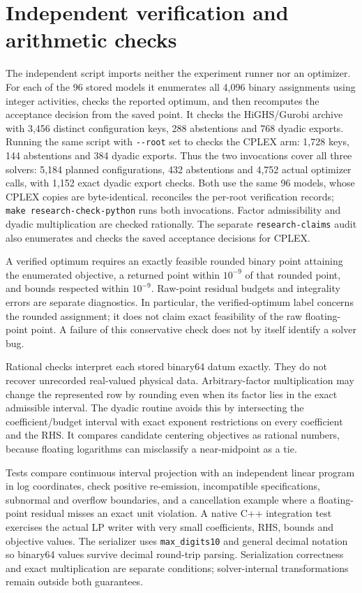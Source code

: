 \documentclass[11pt]{article}
\begin{document}
\section{Independent verification and arithmetic checks}
The independent script  imports
neither the experiment runner nor an optimizer. For each of the 96 stored models it
enumerates all 4,096 binary assignments using integer activities, checks the reported
optimum, and then recomputes the acceptance decision from the saved point. It checks
the HiGHS/Gurobi archive with 3,456 distinct configuration keys, 288 abstentions and
768 dyadic exports. Running the same script with \texttt{-{}-root} set to
 checks the CPLEX arm:
1,728 keys, 144 abstentions and 384 dyadic exports. Thus the two invocations cover
all three solvers: 5,184 planned configurations, 432 abstentions and 4,752 actual
optimizer calls, with 1,152 exact dyadic export checks. Both use the same 96 models,
whose CPLEX copies are byte-identical. 
reconciles the per-root verification records; \texttt{make research-check-python}
runs both invocations. Factor admissibility and dyadic multiplication are checked
rationally. The separate \texttt{research-claims} audit also enumerates and checks
the saved acceptance decisions for CPLEX.

A verified optimum requires an exactly feasible rounded binary point attaining the
enumerated objective, a returned point within $10^{-9}$ of that rounded point,
and bounds respected within $10^{-9}$. Raw-point residual budgets and integrality
errors are separate diagnostics. In particular, the verified-optimum label concerns
the rounded assignment; it does not claim exact feasibility of the raw floating-point
point. A failure of this conservative check does not by itself identify a solver bug.

Rational checks interpret each stored binary64 datum exactly. They do not recover
unrecorded real-valued physical data. Arbitrary-factor multiplication may change the
represented row by rounding even when its factor lies in the exact admissible
interval. The dyadic routine avoids this by intersecting the coefficient/budget
interval with exact exponent restrictions on every coefficient and the RHS.
It compares candidate centering objectives as rational numbers, because floating
logarithms can misclassify a near-midpoint as a tie.

Tests compare continuous interval projection with an independent linear program in
log coordinates, check positive re-emission, incompatible specifications, subnormal
and overflow boundaries, and a cancellation example where a floating-point residual
misses an exact unit violation. A native C++ integration test exercises the actual
LP writer with very small coefficients, RHS, bounds and objective values. The
serializer uses \texttt{max\_digits10} and general decimal notation so binary64
values survive decimal round-trip parsing. Serialization correctness and exact
multiplication are separate conditions; solver-internal transformations remain
outside both guarantees.
\end{document}
